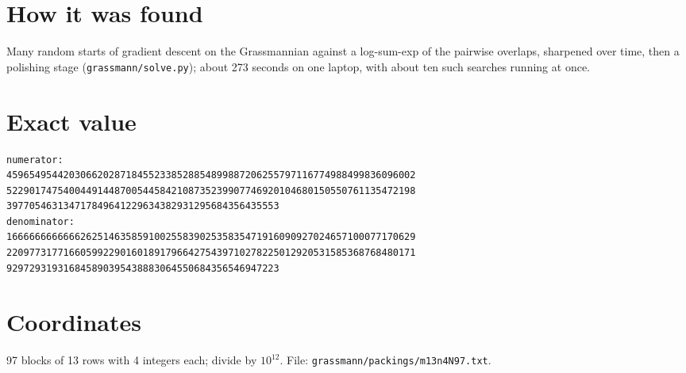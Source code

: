 \documentclass[11pt,a4paper]{article}
\begin{document}
\section{How it was found}
Many random starts of gradient descent on the Grassmannian against a log-sum-exp of the pairwise overlaps, sharpened over time, then a polishing stage (\texttt{grassmann/solve.py}); about 273 seconds on one laptop, with about ten such searches running at once.


\appendix
\section{Exact value}
{\small
\begin{verbatim}
numerator:
459654954420306620287184552338528854899887206255797116774988499836096002
522901747540044914487005445842108735239907746920104680150550761135472198
397705463134717849641229634382931295684356435553
denominator:
166666666666626251463585910025583902535835471916090927024657100077170629
220977317716605992290160189179664275439710278225012920531585368768480171
929729319316845890395438883064550684356546947223
\end{verbatim}}

\section{Coordinates}
97 blocks of 13 rows with 4 integers each; divide by $10^{12}$. File: \texttt{grassmann/packings/m13n4N97.txt}.
{\tiny
\begin{multicols}{3}
\end{multicols}}
\end{document}
